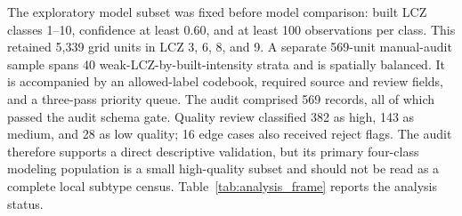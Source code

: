 The exploratory model subset was fixed before model comparison: built LCZ
classes 1--10, confidence at least 0.60, and at least 100 observations per
class. This retained 5,339 grid units in LCZ 3, 6, 8, and 9. A separate 569-unit
manual-audit sample spans 40 weak-LCZ-by-built-intensity strata and is spatially
balanced. It is accompanied by an allowed-label codebook, required source and
review fields, and a three-pass priority queue. The audit comprised 569 records,
all of which passed the audit schema gate. Quality review classified 382 as high, 143 as medium, and 28 as low quality;
16 edge cases also received reject flags. The audit therefore supports a direct
descriptive validation, but its primary four-class modeling population is a
small high-quality subset and should not be read as a complete local subtype
census. Table~\ref{tab:analysis_frame} reports the analysis status.


